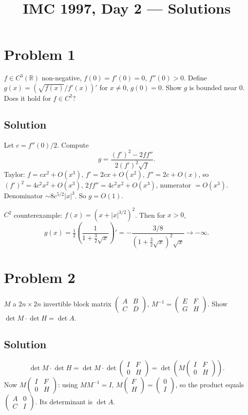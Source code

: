 \documentclass{article}
\title{IMC 1997, Day 2 --- Solutions}
\begin{document}
\maketitle

\section*{Problem 1}
$f\in C^3(\mathbb{R})$ non-negative, $f(0)=f'(0)=0$, $f''(0)>0$. Define $g(x) = (\sqrt{f(x)}/f'(x))'$ for $x\ne 0$, $g(0)=0$. Show $g$ is bounded near $0$. Does it hold for $f\in C^2$?

\subsection*{Solution}
Let $c = f''(0)/2$. Compute
\[g = \frac{(f')^2 - 2ff''}{2(f')^2\sqrt f}.\]
Taylor: $f=cx^2+O(x^3)$, $f'=2cx+O(x^2)$, $f''=2c+O(x)$, so $(f')^2 = 4c^2x^2+O(x^3)$, $2ff''=4c^2x^2+O(x^3)$, numerator $= O(x^3)$. Denominator $\sim 8c^{5/2}|x|^3$. So $g=O(1)$.

$C^2$ counterexample: $f(x)=(x+|x|^{3/2})^2$. Then for $x>0$,
\[g(x) = \tfrac 12\left(\frac{1}{1+\tfrac 32\sqrt x}\right)' = -\frac{3/8}{(1+\tfrac 32\sqrt x)^2\sqrt x} \to -\infty.\]

\section*{Problem 2}
$M$ a $2n\times 2n$ invertible block matrix $\begin{pmatrix}A&B\\C&D\end{pmatrix}$, $M^{-1} = \begin{pmatrix}E&F\\G&H\end{pmatrix}$. Show $\det M\cdot\det H = \det A$.

\subsection*{Solution}
\[\det M\cdot\det H = \det M\cdot\det\begin{pmatrix}I&F\\0&H\end{pmatrix} = \det\left(M\begin{pmatrix}I&F\\0&H\end{pmatrix}\right).\]
Now $M\begin{pmatrix}I&F\\0&H\end{pmatrix}$: using $MM^{-1}=I$, $M\begin{pmatrix}F\\H\end{pmatrix}=\begin{pmatrix}0\\I\end{pmatrix}$, so the product equals $\begin{pmatrix}A&0\\C&I\end{pmatrix}$. Its determinant is $\det A$.
\end{document}
